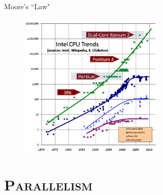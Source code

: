 \documentclass[xcolor=x11names,compress]{beamer}
\renewcommand{\(}{\begin{columns}}
\renewcommand{\)}{\end{columns}}
\newcommand{\<}[1]{\begin{column}{#1}}
\renewcommand{\>}{\end{column}}
\begin{document}
\begin{frame}{Moore's ``Law"}

\begin{figure}
\includegraphics[height=2.75in,clip]{CPU-Scaling}
\end{figure}

\end{frame}

\section{\scshape Parallelism}
\end{document}
